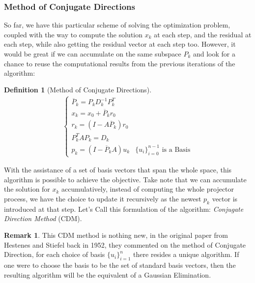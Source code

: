 \documentclass[]{article}
\theoremstyle{definition}
\newtheorem{definition}{Definition}      %
\newtheorem{remark}{Remark}[subsection]  %
\begin{document}
        \subsubsection{Method of Conjugate Directions}
            So far, we have this particular scheme of solving the optimization problem, coupled with the way to compute the solution $x_k$ at each step, and the residual at each step, while also getting the residual vector at each step too. However, it would be great if we can accumulate on the same subspace $P_k$ and look for a chance to reuse the computational results from the previous iterations of the algorithm: 
            \begin{definition}[Method of Conjugate Directions]
                \begin{align}
                    \begin{cases}
                        \overline{P}_k = P_kD^{-1}_kP_k^T
                        \\
                        x_k = x_0 + \overline{P}_k r_0
                        \\
                        r_k = (I - A\overline{P}_k) r_0
                        \\
                        P^T_kAP_k = D_k
                        \\
                        p_k = (I - \overline{P}_kA)u_k & \{u_i\}_{i = 0}^{n - 1} \text{ is a Basis}
                    \end{cases}
                \end{align}
            \end{definition}
            With the assistance of a set of basis vectors that span the whole space, this algorithm is possible to achieve the objective. Take note that we can accumulate the solution for $x_k$ accumulatively, instead of computing the whole projector process, we have the choice to update it recursively as the newest $p_k$ vector is introduced at that step. Let's Call this formulation of the algorithm: \textit{Conjugate Direction Method }(CDM). 
            \begin{remark}
                This CDM method is nothing new, in the original paper from Hestenes and Stiefel back in 1952\cite{paper:cg_original}, they commented on the method of Conjugate Direction, for each choice of basis $\{u_i\}_{i = 1}^n$ there resides a unique algorithm. If one were to choose the basis to be the set of standard basis vectors, then the resulting algorithm will be the equivalent of a Gaussian Elimination. 
            \end{remark}
\end{document}
